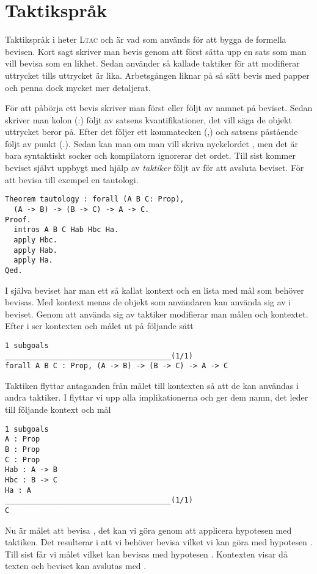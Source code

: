 \section{Taktikspråk}
Taktikspråk i \coq{} heter \textsc{Ltac} och är vad som används för att bygga de
formella bevisen. Kort sagt skriver man bevis genom att först sätta upp en sats
som man vill bevisa som en likhet. Sedan använder så kallade taktiker för att
modifierar uttrycket tills uttrycket är lika. Arbetsgången liknar på så sätt
bevis med papper och penna dock mycket mer detaljerat.

För att påbörja ett bevis skriver man först  eller  följt
av namnet på beviset. Sedan skriver man kolon (:) följt av satsens
kvantifikationer, det vill säga de objekt uttrycket beror på. Efter det följer
ett kommatecken (,) och satsens påstående följt av punkt (.). Sedan kan man om
man vill skriva nyckelordet , men det är bara syntaktiskt socker och
kompilatorn ignorerar det ordet. Till sist kommer beviset självt uppbygt med
hjälp av \emph{taktiker} följt av  för att avsluta beviset. För att
bevisa till exempel en tautologi.

\begin{lstlisting}
Theorem tautology : forall (A B C: Prop),
  (A -> B) -> (B -> C) -> A -> C.
Proof.
  intros A B C Hab Hbc Ha.
  apply Hbc.
  apply Hab.
  apply Ha.
Qed.
\end{lstlisting}

I själva beviset har man ett så kallat kontext och en lista med mål som behöver
bevisas. Med kontext menas de objekt som användaren kan använda sig av i
beviset. Genom att använda sig av taktiker modifierar man målen och kontextet.
Efter  i  ser kontexten och målet ut på följande sätt
\begin{lstlisting}
1 subgoals
______________________________________(1/1)
forall A B C : Prop, (A -> B) -> (B -> C) -> A -> C
\end{lstlisting}

Taktiken  flyttar antaganden från målet till kontexten så att de kan
användas i andra taktiker. I  flyttar vi upp alla implikationerna
och ger dem namn, det leder till följande kontext och mål
\begin{lstlisting}
1 subgoals
A : Prop
B : Prop
C : Prop
Hab : A -> B
Hbc : B -> C
Ha : A
______________________________________(1/1)
C
\end{lstlisting}

Nu är målet att bevisa , det kan vi göra genom att applicera hypotesen
 med  taktiken. Det resulterar i att vi behöver bevisa 
vilket vi kan göra med hypotesen . Till sist får vi målet  vilket
kan bevisas med hypotesen . Kontexten visar då texten  och beviset kan avslutas med .
